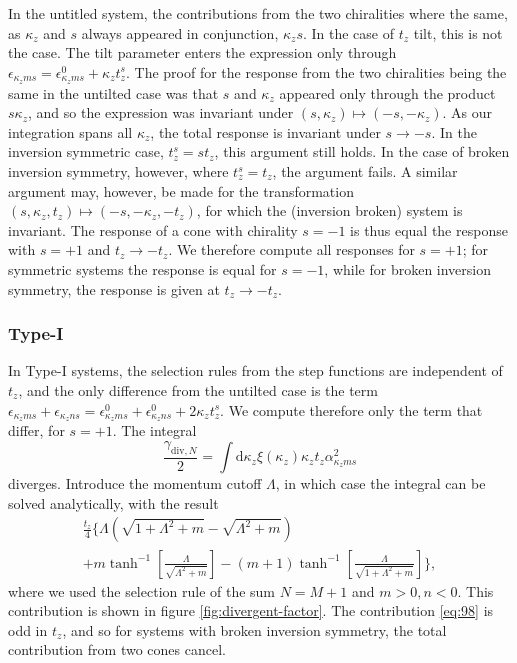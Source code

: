 In the untitled system, the contributions from the two chiralities where the same, as \( \kappa_z \) and \( s \) always appeared in conjunction, \( \kappa_z s \).
In the case of \( t_z \) tilt, this is not the case.
The tilt parameter enters the expression only through \( \epsilon_{\kappa_z m s} = \epsilon_{\kappa_z m s}^0 + \kappa_z t^s_z \).
The proof for the response from the two chiralities being the same in the untilted case was that \( s \) and \( \kappa_z \) appeared only through the product \( s \kappa_z \), and so the expression was invariant under \( (s, \kappa_z) \mapsto (-s, -\kappa_z) \).
As our integration spans all \( \kappa_z \), the total response is invariant under \( s \to -s \).
In the inversion symmetric case, \( t^s_z = s t_z \), this argument still holds.
In the case of broken inversion symmetry, however, where \( t^s_z = t_z \), the argument fails.
A similar argument may, however, be made for the transformation \( (s, \kappa_z, t_z) \mapsto (-s, -\kappa_z, -t_z) \), for which the (inversion broken) system is invariant.
The response of a cone with chirality \( s = -1 \) is thus equal the response with \( s = +1 \) and \( t_z \to -t_z \).
We therefore compute all responses for \( s=+1 \);
for symmetric systems the response is equal for \( s=-1 \), while for broken inversion symmetry, the response is given at \( t_z \to -t_z \).

\subsubsection{Type-I}
In Type-I systems, the selection rules from the step functions are independent of \( t_z \), and the only difference from the untilted case is the term \( \epsilon_{\kappa_z m s} + \epsilon_{\kappa_z n s} = \epsilon^0_{\kappa_z m s} + \epsilon^0_{\kappa_z n s} + 2 \kappa_z t^s_z \).
We compute therefore only the term that differ, for \( s=+1 \).
The integral
\begin{equation}
  \label{eq:97}
  \frac{\gamma_{\text{div}, N}}{2} = \int \mathrm{d}\kappa_z \xi(\kappa_z) \kappa_z t_z \alpha_{\kappa_z m s}^2
\end{equation}
diverges.
Introduce the momentum cutoff \( \Lambda \), in which case the integral can be solved analytically, with the result
\begin{multline}
  \frac{t_z}{4}
  \Bigg\{
    \Lambda\left(\sqrt{1 + \Lambda^2 + m} - \sqrt{\Lambda^2 + m}  \right)\\
    + m \tanh^{-1}\left[\frac{\Lambda}{\sqrt{\Lambda^2 + m} } \right]
    - (m+1) \tanh^{-1}\left[\frac{\Lambda}{\sqrt{1 + \Lambda^2 + m }}\right]
    \Bigg\},
    \label{eq:98}
\end{multline}
where we used the selection rule of the sum \( N=M+1 \) and \( m>0, n<0 \).
This contribution is shown in figure \ref{fig:divergent-factor}.
The contribution \eqref{eq:98} is odd in \( t_z \), and so for systems with broken inversion symmetry, the total contribution from two cones cancel.


